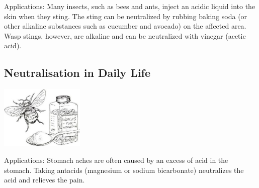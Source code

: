 \begin{multicols}{2}
\begin{description*}
\item[Applications:]{Many insects, such as bees and ants, inject an acidic liquid into the skin when they sting. The sting can be neutralized by rubbing baking soda (or other alkaline substances such as cucumber and avocado) on the affected area. Wasp stings, however, are alkaline and can be neutralized with vinegar (acetic acid).}
\end{description*}

\columnbreak

\subsection{Neutralisation in Daily Life}

\begin{center}
\includegraphics[width=0.3\textwidth]{./img/source/neutralisation-daily.jpg}
\end{center}

\begin{description*}
\item[Applications:]{Stomach aches are often caused by an excess of acid in the stomach. Taking antacids (magnesium or sodium bicarbonate) neutralizes the acid and relieves the pain. }
\end{description*}


\end{multicols}
